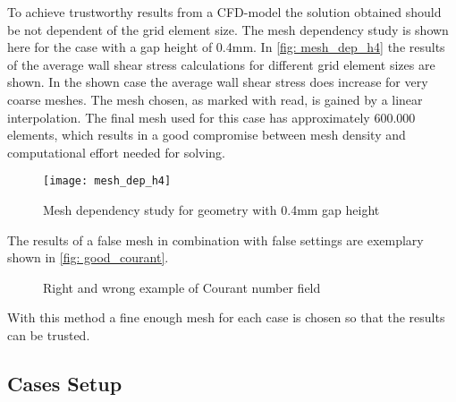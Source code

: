 \documentclass[../thesis.tex]{subfiles}
\begin{document}
To achieve trustworthy results from a CFD-model the solution obtained should be not dependent of the grid element size. The mesh dependency study is shown here for the case with a gap height of 0.4mm. In \autoref{fig: mesh_dep_h4} the results of the average wall shear stress calculations for different grid element sizes are shown. In the shown case the average wall shear stress does increase for very coarse meshes. The mesh chosen, as marked with read, is gained by a linear interpolation. The final mesh used for this case has approximately 600.000 elements, which results in a good compromise between mesh density and computational effort needed for solving.
\begin{figure}[htb]
	\centering
	\texttt{[image: mesh\_dep\_h4]}
	\caption{Mesh dependency study for geometry with 0.4mm gap height}
	\label{fig: mesh_dep_h4}
\end{figure}

The results of a false mesh in combination with false settings are exemplary shown in \autoref{fig: good_courant}.
\begin{figure}[htbp]
	\centering
	\qquad
	\caption{Right and wrong example of Courant number field}
	\label{fig: good_courant}
\end{figure}
With this method a fine enough mesh for each case is chosen so that the results can be trusted.

\subsection{Cases Setup}
\end{document}

